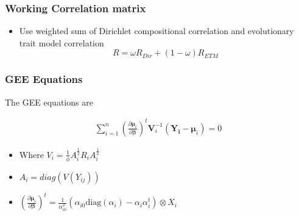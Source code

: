 \documentclass{beamer}
\begin{document}
\begin{frame}
\frametitle{Working Correlation matrix}
\begin{itemize}
  \item Use weighted sum of Dirichlet compositional correlation and evolutionary trait model correlation
  \[R = \omega R_{Dir} + (1-\omega)R_{ETM} \]
\end{itemize}
\end{frame}

\begin{frame}
\frametitle{GEE Equations}
The GEE equations are

\begin{align*}
  \sum_{i = 1}^n  \left(\frac{\partial  \boldsymbol\mu_i }{\partial \boldsymbol\beta }\right)^t\mathbf{V}_i^{-1}(\mathbf{Y_i} - \boldsymbol\mu_i) = 0
\end{align*}

\begin{itemize}
  \item Where $ V_i = \frac{1}{\phi} A_i^{\tfrac{1}{2}}R_iA_i^{\tfrac{1}{2}}$

  \item $A_i = diag(V(Y_{ij}))$


  \item $ \left(\frac{\partial  \boldsymbol\mu_i }{\partial \boldsymbol\beta }\right)^t  = \frac{1}{\alpha_{i0}^2} (\alpha_{i0} \text{diag}(\alpha_i) - \alpha_i \alpha_i^t)  \otimes X_i$


\end{itemize}



\end{frame}
\end{document}
